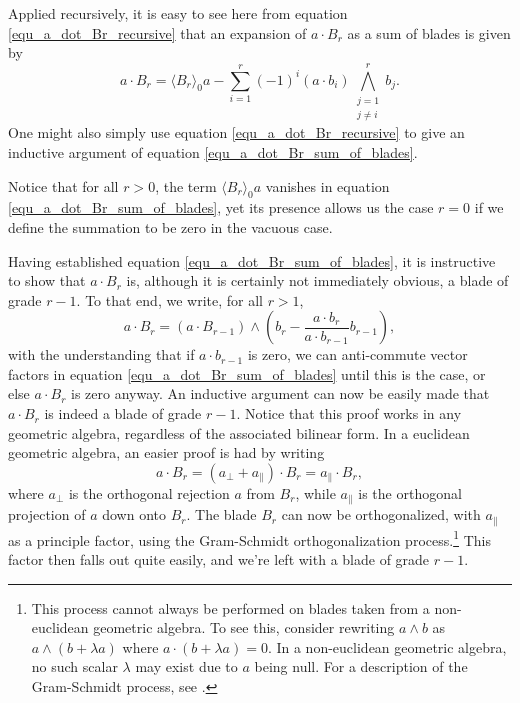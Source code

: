 \documentclass{birkjour}
\theoremstyle{definition}
\theoremstyle{remark}
\numberwithin{equation}{section}
\begin{document}
Applied recursively, it is easy to see here from equation \eqref{equ_a_dot_Br_recursive} that an expansion of
$a\cdot B_r$ as a sum of blades is given by
\begin{equation}\label{equ_a_dot_Br_sum_of_blades}
a\cdot B_r = \langle B_r\rangle_0a - \sum_{i=1}^r(-1)^i(a\cdot b_i)\bigwedge_{\substack{j=1\\j\neq i}}^r b_j.
\end{equation}
One might also simply use equation \eqref{equ_a_dot_Br_recursive} to give an inductive
argument of equation \eqref{equ_a_dot_Br_sum_of_blades}.

Notice that for all $r>0$, the term $\langle B_r\rangle_0a$ vanishes in equation \eqref{equ_a_dot_Br_sum_of_blades},
yet its presence allows us the case $r=0$ if we define the summation to be zero in the vacuous case.

Having established equation \eqref{equ_a_dot_Br_sum_of_blades}, it is instructive to show that $a\cdot B_r$ is,
although it is certainly not immediately obvious, a blade of grade $r-1$.  To that end, we write, for all $r>1$,
\begin{equation*}
a\cdot B_r = (a\cdot B_{r-1})\wedge\left(b_r - \frac{a\cdot b_r}{a\cdot b_{r-1}}b_{r-1}\right),
\end{equation*}
with the understanding that if $a\cdot b_{r-1}$ is zero, we can anti-commute vector factors in equation \eqref{equ_a_dot_Br_sum_of_blades}
until this is the case, or else $a\cdot B_r$ is zero anyway.
An inductive argument can now be easily made that $a\cdot B_r$ is indeed a blade of grade $r-1$.
Notice that this proof works in any geometric algebra, regardless of the associated bilinear form.  In a euclidean geometric
algebra, an easier proof is had by writing
\begin{equation*}
a\cdot B_r = (a_{\perp} + a_{\parallel})\cdot B_r = a_{\parallel}\cdot B_r,
\end{equation*}
where $a_{\perp}$ is the orthogonal rejection $a$ from $B_r$, while $a_{\parallel}$ is the
orthogonal projection of $a$ down onto $B_r$.  The blade $B_r$ can now be orthogonalized,
with $a_{\parallel}$ as a principle factor, using the Gram-Schmidt orthogonalization process.\footnote{This process
cannot always be performed on blades taken from a non-euclidean geometric algebra.  To see this, consider rewriting
$a\wedge b$ as $a\wedge(b+\lambda a)$ where $a\cdot(b+\lambda a)=0$.  In a non-euclidean geometric algebra,
no such scalar $\lambda$ may exist due to $a$ being null.  For a description of the Gram-Schmidt process, see \cite{}.}
This factor then falls out quite easily, and we're left with a blade of grade $r-1$.
\end{document}

